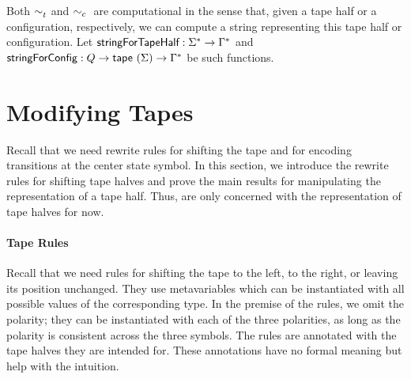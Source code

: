 Both $\sim_t^{}$ and $\sim_c{}$ are computational \mnote[stringForTapeHalf]{$\stringForTapeHalf$}in the sense that, given a tape half or a configuration, respectively, we can compute a string representing this tape half or configuration. 
Let $\textsf{stringForTapeHalf} : \Sigma^* \rightarrow \Gamma^*$ and $\textsf{stringForConfig} : Q \rightarrow \textsf{tape}~(\Sigma) \rightarrow \Gamma^*$ be such functions.
\mnote[stringForConfig]{$\stringForConfig$}

\section{Modifying Tapes}\label{sec:taperules}
Recall that we need rewrite rules for shifting the tape and for encoding transitions at the center state symbol. 
In this section, we introduce the rewrite rules for shifting tape halves and prove the main results for manipulating the representation of a tape half. Thus, are only concerned with the representation of tape halves for now.

\paragraph{Tape Rules}
Recall that we need rules for shifting the tape to the left, to the right, or leaving its position unchanged.
They use metavariables which can be instantiated with all possible values of the corresponding type. In the premise of the rules, we omit the polarity; they can be instantiated with each of the three polarities, as long as the polarity is consistent across the three symbols.
The rules are annotated with the tape halves they are intended for. These annotations have no formal meaning but help with the intuition.

\newcommand{\centerTheFuckingText}[1]{
  \begin{tikzpicture}
    \draw[color=white,thick] (0, 0) -- (2.25, 0);
    \draw[color=white] (0.75, -0.75) -- (0.75, 0.75);
    \draw[color=white] (1.5, -0.75) -- (1.5, 0.75);
    \node at (2.25, 0) {#1};
  \end{tikzpicture}
}
